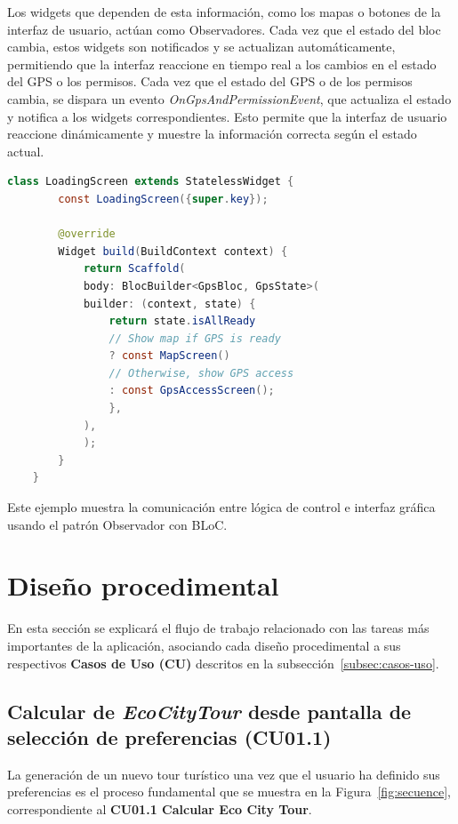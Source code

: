 Los widgets que dependen de esta información, como los mapas o botones de la interfaz de usuario, actúan como Observadores. Cada vez que el estado del \acrshort{bloc} cambia, estos widgets son notificados y se actualizan automáticamente, permitiendo que la interfaz reaccione en tiempo real a los cambios en el estado del GPS o los permisos.
Cada vez que el estado del GPS o de los permisos cambia, se dispara un evento \textit{OnGpsAndPermissionEvent}, que actualiza el estado y notifica a los widgets correspondientes. Esto permite que la interfaz de usuario reaccione dinámicamente y muestre la información correcta según el estado actual.

\begin{lstlisting}[language=Java, captionpos=b, frame=single, basicstyle=\ttfamily\footnotesize, caption={Carga en función del estado}, label={lst:loading-screen}]
	class LoadingScreen extends StatelessWidget {
		const LoadingScreen({super.key});

		@override
		Widget build(BuildContext context) {
			return Scaffold(
			body: BlocBuilder<GpsBloc, GpsState>(
			builder: (context, state) {
				return state.isAllReady
				// Show map if GPS is ready
				? const MapScreen()  
				// Otherwise, show GPS access
				: const GpsAccessScreen(); 
				},
			),
			);
		}
	}
\end{lstlisting}


	
Este ejemplo muestra la comunicación entre lógica de control e interfaz gráfica usando el patrón Observador con BLoC.


\section{Diseño procedimental}
En esta sección se explicará el flujo de trabajo relacionado con las tareas más importantes de la aplicación, asociando cada diseño procedimental a sus respectivos \textbf{Casos de Uso (CU)} descritos en la subsección~\ref{subsec:casos-uso}.

\subsection{Calcular de \textit{EcoCityTour} desde pantalla de selección de preferencias (CU01.1)}
La generación de un nuevo tour turístico una vez que el usuario ha definido sus preferencias es el proceso fundamental que se muestra en la Figura~\ref{fig:secuence}, correspondiente al \textbf{CU01.1 Calcular Eco City Tour}.

